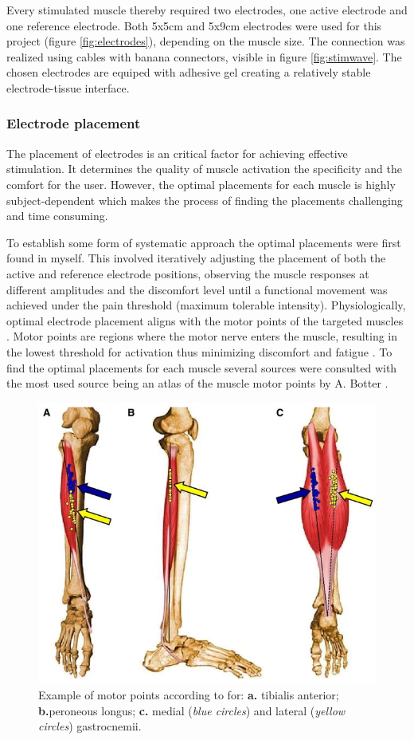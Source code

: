 Every stimulated muscle thereby required two electrodes, one active electrode and one reference electrode. Both 5x5cm and 5x9cm electrodes were used for this project (figure \ref{fig:electrodes}), depending on the muscle size. The connection was realized using cables with banana connectors, visible in figure \ref{fig:stimwave}. The chosen electrodes are equiped with adhesive gel creating a relatively stable electrode-tissue interface. 

\subsubsection{Electrode placement}
The placement of electrodes is an critical factor for achieving effective stimulation. It determines the quality of muscle activation the specificity and the comfort for the user. However, the optimal placements for each muscle is highly subject-dependent which makes the process of finding the placements challenging and time consuming.

To establish some form of systematic approach the optimal placements were first found in myself. This involved iteratively adjusting the placement of both the active and reference electrode positions, observing the muscle responses at different amplitudes and the discomfort level until a functional movement was achieved under the pain threshold (maximum tolerable intensity). Physiologically, optimal electrode placement aligns with the motor points of the targeted muscles \cite{gobbo_muscle_2014}. Motor points are regions where the motor nerve enters the muscle, resulting in the lowest threshold for activation thus minimizing discomfort and fatigue \cite{gobbo_muscle_2014}. To find the optimal placements for each muscle several sources were consulted with the most used source being an atlas of the muscle motor points by A. Botter \cite{botter_atlas_2011}. 

\begin{figure}
    \centering
    \includegraphics[width=0.6\linewidth]{images/screenshotmotorpoint.png}
    \caption{Example of motor points according to \cite{botter_atlas_2011} for: \textbf{a.} tibialis anterior; \textbf{b.}peroneous longus; \textbf{c.} medial (\textit{blue circles}) and lateral (\textit{yellow circles}) gastrocnemii. }
    \label{fig:motor-points}
\end{figure}

